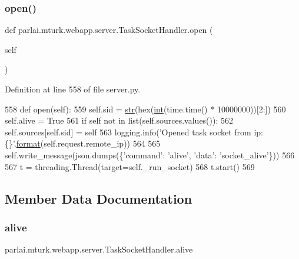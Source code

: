 \subsubsection{\texorpdfstring{open()}{open()}}
{\footnotesize\ttfamily def parlai.\+mturk.\+webapp.\+server.\+Task\+Socket\+Handler.\+open (\begin{DoxyParamCaption}\item[{}]{self }\end{DoxyParamCaption})}



Definition at line 558 of file server.\+py.


\begin{DoxyCode}
558     \textcolor{keyword}{def }open(self):
559         self.sid = \hyperlink{namespacegenerate__task__READMEs_a5b88452ffb87b78c8c85ececebafc09f}{str}(hex(\hyperlink{namespacelanguage__model_1_1eval__ppl_a7d12ee00479673c5c8d1f6d01faa272a}{int}(time.time() * 10000000))[2:])
560         self.alive = \textcolor{keyword}{True}
561         \textcolor{keywordflow}{if} self \textcolor{keywordflow}{not} \textcolor{keywordflow}{in} list(self.sources.values()):
562             self.sources[self.sid] = self
563         logging.info(\textcolor{stringliteral}{'Opened task socket from ip: \{\}'}.\hyperlink{namespaceparlai_1_1chat__service_1_1services_1_1messenger_1_1shared__utils_a32e2e2022b824fbaf80c747160b52a76}{format}(self.request.remote\_ip))
564 
565         self.write\_message(json.dumps(\{\textcolor{stringliteral}{'command'}: \textcolor{stringliteral}{'alive'}, \textcolor{stringliteral}{'data'}: \textcolor{stringliteral}{'socket\_alive'}\}))
566 
567         t = threading.Thread(target=self.\_run\_socket)
568         t.start()
569 
\end{DoxyCode}


\subsection{Member Data Documentation}
\mbox{\label{classparlai_1_1mturk_1_1webapp_1_1server_1_1TaskSocketHandler_a730b42ceee91d8ce1278f60c65595a71}} 
\subsubsection{\texorpdfstring{alive}{alive}}
{\footnotesize\ttfamily parlai.\+mturk.\+webapp.\+server.\+Task\+Socket\+Handler.\+alive}



